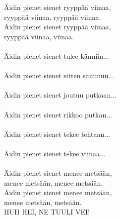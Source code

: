 
            Äidin pienet sienet ryyppää viinaa, \\
            ryyppää viinaa, ryyppää viinaa. \\
            Äidin pienet sienet ryyppää viinaa, \\
            ryyppää viinaa, viinaa. \\
\hspace{10mm} \\
            Äidin pienet sienet tulee känniin... \\
\hspace{10mm} \\
            Äidin pienet sienet sitten sammuu... \\
\hspace{10mm} \\
            Äidin pienet sienet joutuu putkaan... \\
\hspace{10mm} \\
            Äidin pienet sienet rikkoo putkan... \\
\hspace{10mm} \\
            Äidin pienet sienet tekee tehtaan... \\
\hspace{10mm} \\
            Äidin pienet sienet tekee viinaa... \\
\hspace{10mm} \\
            Äidin pienet sienet menee metsään, \\
            menee metsään, menee metsään. \\
            Äidin pienet sienet menee metsään, \\
            menee metsään, metsään. \\
            HUH HEI, NE TUULI VEI! \\
